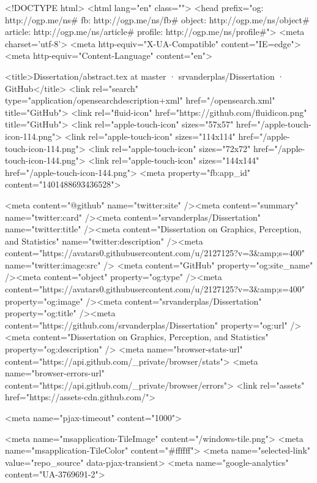 


<!DOCTYPE html>
<html lang="en" class="">
  <head prefix="og: http://ogp.me/ns# fb: http://ogp.me/ns/fb# object: http://ogp.me/ns/object# article: http://ogp.me/ns/article# profile: http://ogp.me/ns/profile#">
    <meta charset='utf-8'>
    <meta http-equiv="X-UA-Compatible" content="IE=edge">
    <meta http-equiv="Content-Language" content="en">
    
    
    <title>Dissertation/abstract.tex at master · srvanderplas/Dissertation · GitHub</title>
    <link rel="search" type="application/opensearchdescription+xml" href="/opensearch.xml" title="GitHub">
    <link rel="fluid-icon" href="https://github.com/fluidicon.png" title="GitHub">
    <link rel="apple-touch-icon" sizes="57x57" href="/apple-touch-icon-114.png">
    <link rel="apple-touch-icon" sizes="114x114" href="/apple-touch-icon-114.png">
    <link rel="apple-touch-icon" sizes="72x72" href="/apple-touch-icon-144.png">
    <link rel="apple-touch-icon" sizes="144x144" href="/apple-touch-icon-144.png">
    <meta property="fb:app_id" content="1401488693436528">

      <meta content="@github" name="twitter:site" /><meta content="summary" name="twitter:card" /><meta content="srvanderplas/Dissertation" name="twitter:title" /><meta content="Dissertation on Graphics, Perception, and Statistics" name="twitter:description" /><meta content="https://avatars0.githubusercontent.com/u/2127125?v=3&amp;s=400" name="twitter:image:src" />
      <meta content="GitHub" property="og:site_name" /><meta content="object" property="og:type" /><meta content="https://avatars0.githubusercontent.com/u/2127125?v=3&amp;s=400" property="og:image" /><meta content="srvanderplas/Dissertation" property="og:title" /><meta content="https://github.com/srvanderplas/Dissertation" property="og:url" /><meta content="Dissertation on Graphics, Perception, and Statistics" property="og:description" />
      <meta name="browser-stats-url" content="https://api.github.com/_private/browser/stats">
    <meta name="browser-errors-url" content="https://api.github.com/_private/browser/errors">
    <link rel="assets" href="https://assets-cdn.github.com/">
    
    <meta name="pjax-timeout" content="1000">
    

    <meta name="msapplication-TileImage" content="/windows-tile.png">
    <meta name="msapplication-TileColor" content="#ffffff">
    <meta name="selected-link" value="repo_source" data-pjax-transient>
      <meta name="google-analytics" content="UA-3769691-2">

